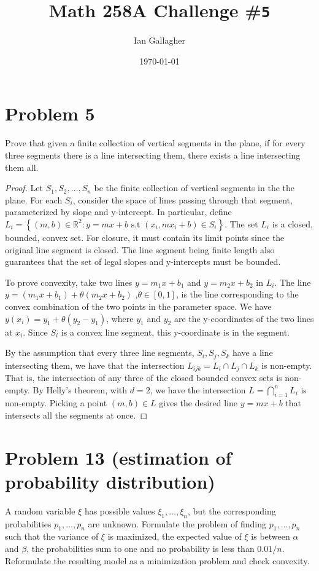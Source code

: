 \documentclass[11pt]{article}
\title{Math 258A Challenge \#\texttt{5}}
\author{Ian Gallagher}
\date{\today}
\theoremstyle{problemstyle}
\begin{document}
\maketitle

\section*{Problem 5}
Prove that given a finite collection of vertical segments in the plane, if for
every three segments there is a line intersecting them, there exists a line
intersecting them all.

\begin{proof}
  Let $S_1, S_2, \ldots, S_n$ be the finite collection of vertical segments in
  the the plane. For each $S_i$, consider the space of lines passing through
  that segment, parameterized by slope and y-intercept. In particular, define
  $L_i = \left\{(m, b) \in \mathbb{R}^2 : y = mx + b \text{ s.t } (x_i, mx_i +
  b) \in S_i\right\}$. The set $L_i$ is a closed, bounded, convex set. For
  closure, it must contain its limit points since the original line segment is
  closed. The line segment being finite length also guarantees that the set of
  legal slopes and y-intercepts must be bounded.

  To prove convexity, take two lines $y = m_1x + b_1$ and $y = m_2x + b_2$ in
  $L_i$. The line $y = (m_1x + b_1) + \theta \left(m_2x + b_2\right)$ ,$\theta
  \in [0, 1]$, is the line corresponding to the convex combination of the two
  points in the parameter space. We have $y(x_i) = y_1 + \theta(y_2 - y_1)$,
  where $y_1$ and $y_2$ are the y-coordinates of the two lines at $x_i$. Since
  $S_i$ is a convex line segment, this y-coordinate is in the segment.

  By the assumption that every three line segments, $S_i, S_j, S_k$ have a line
  intersecting them, we have that the intersection $L_{ijk} = L_i \cap L_j \cap
  L_k$ is non-empty. That is, the intersection of any three of the closed
  bounded convex sets is non-empty. By Helly's theorem, with $d = 2$, we have
  the intersection $L = \bigcap_{i=1}^n L_i$ is non-empty. Picking a point $(m, b)
  \in L$ gives the desired line $y = mx + b$ that intersects all the segments at
  once.
\end{proof}

\section*{Problem 13 (estimation of probability distribution)}
A random variable $\xi$ has possible values $\xi_1, \ldots, \xi_n$, but the
corresponding probabilities $p_1, \ldots, p_n$ are unknown. Formulate the
problem of finding $p_1, \ldots, p_n$ such that the variance of $\xi$ is
maximized, the expected value of $\xi$ is between $\alpha$ and $\beta$, the
probabilities sum to one and no probability is less than $0.01/n$. Reformulate
the resulting model as a minimization problem and check convexity.
\end{document}
